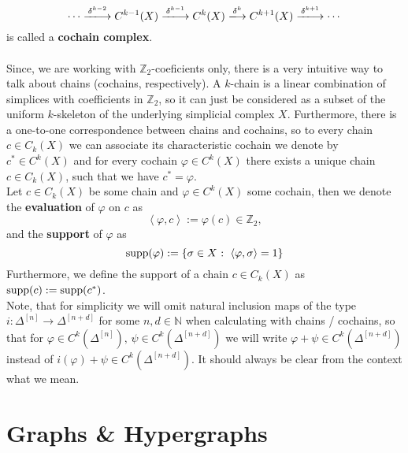 \[
\cdots\xlongrightarrow{\delta^{k-2}} C^{k-1}(X)\xlongrightarrow{\delta^{k-1}} C^k(X)\xlongrightarrow{\delta^k} C^{k+1}(X)\xlongrightarrow{\delta^{k+1}}\cdots
\]
is called a \textbf{cochain complex}.\\
\\
Since, we are working with \(\mathbb{Z}_2\)-coeficients only, there is a very intuitive way to talk about chains (cochains, respectively). A \(k\)-chain is a linear combination of simplices with coefficients in \(\mathbb{Z}_2\), so it can just be considered as a subset of the uniform \(k\)-skeleton of the underlying simplicial complex \(X\). Furthermore, there is a one-to-one correspondence between chains and cochains, so to every chain \(c\in C_k(X)\) we can associate its characteristic cochain we denote by \(c^*\in C^k(X)\) and for every cochain \(\varphi\in C^k(X)\) there exists a unique chain \(c\in C_k(X)\), such that we have \(c^*=\varphi\).\\
Let \(c\in C_k(X)\) be some chain and \(\varphi\in C^k(X)\) some cochain, then we denote the \textbf{evaluation} of \(\varphi\) on \(c\) as
\[
\left\langle\varphi,c\right\rangle:=\varphi(c)\in\mathbb{Z}_2,
\]
and the \textbf{support} of \(\varphi\) as
\[
\mathrm{supp}(\varphi):=\left\{\sigma\in X\text{ : }\left\langle\varphi,\sigma\right\rangle=1\right\}
\]
Furthermore, we define the support of a chain \(c\in C_k(X)\) as \(\mathrm{supp}(c):=\mathrm{supp}(c^*)\).\\
Note, that for simplicity we will omit natural inclusion maps of the type\\
\(i:\Delta^{[n]}\longrightarrow\Delta^{[n+d]}\) for some \(n,d\in\mathbb{N}\) when calculating with chains / cochains, so that for \(\varphi\in C^k(\Delta^{[n]})\text{, }\psi\in C^k(\Delta^{[n+d]})\) we will write \(\varphi+\psi\in C^k(\Delta^{[n+d]})\) instead of \(i(\varphi)+\psi\in C^k(\Delta^{[n+d]})\). It should always be clear from the context what we mean.

\section{Graphs \& Hypergraphs}

